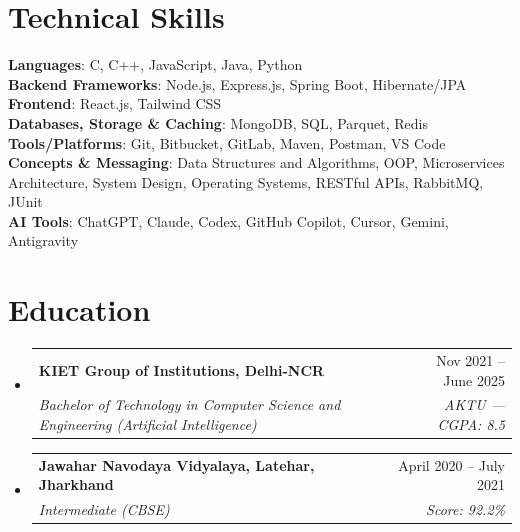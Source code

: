 \documentclass[letterpaper,11pt]{article}
\makeatletter
\newcommand{\headingToBullets}{\vspace{-0.5pt}}  %
\newcommand{\entrySep}{\vspace{4pt}}             %
\newcommand{\resumeEduHeading}[4]{
  \item
    \begin{tabular*}{0.97\textwidth}[t]{l@{\extracolsep{\fill}}r}
      \textbf{#1} & #2 \\
      \textit{\small#3} & \textit{\small #4} \\
    \end{tabular*}\headingToBullets
}
\newcommand{\resumeSubHeadingListStart}{\begin{itemize}[leftmargin=0.15in, label={}]}
\newcommand{\resumeSubHeadingListEnd}{\end{itemize}}
\makeatother
\begin{document}
\section{Technical Skills}
 \begin{itemize}[leftmargin=0.15in, label={}]
    \small{\item{
     \textbf{Languages}{: C, C++, JavaScript, Java, Python} \\
     \textbf{Backend Frameworks}{: Node.js, Express.js, Spring Boot, Hibernate/JPA} \\
     \textbf{Frontend}{: React.js, Tailwind CSS} \\
     \textbf{Databases, Storage \& Caching}{: MongoDB, SQL, Parquet, Redis} \\
     \textbf{Tools/Platforms}{: Git, Bitbucket, GitLab, Maven, Postman, VS Code} \\
     \textbf{Concepts \& Messaging}{: Data Structures and Algorithms, OOP, Microservices Architecture, System Design, Operating Systems, RESTful APIs, RabbitMQ, JUnit} \\
     \textbf{AI Tools}{: ChatGPT, Claude, Codex, GitHub Copilot, Cursor, Gemini, Antigravity}
    }}
 \end{itemize}\vspace{-6pt}

\section{Education}
  \resumeSubHeadingListStart
    \resumeEduHeading
      {KIET Group of Institutions, Delhi-NCR}{Nov 2021 -- June 2025}
      {Bachelor of Technology in Computer Science and Engineering (Artificial Intelligence)}{AKTU --- CGPA: 8.5}
    \entrySep
    \resumeEduHeading
      {Jawahar Navodaya Vidyalaya, Latehar, Jharkhand}{April 2020 -- July 2021}
      {Intermediate (CBSE)}{Score: 92.2\%}
  \resumeSubHeadingListEnd
\end{document}
